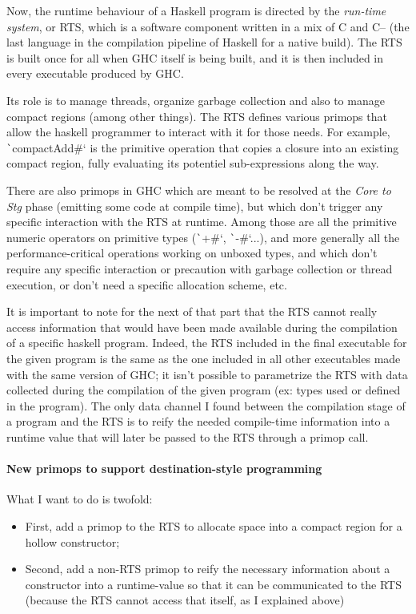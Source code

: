 \documentclass[english]{jflart}
\begin{document}
Now, the runtime behaviour of a Haskell program is directed by the \emph{run-time system}, or RTS, which is a software component written in a mix of C and C-- (the last language in the compilation pipeline of Haskell for a native build). The RTS is built once for all when GHC itself is being built, and it is then included in every executable produced by GHC.

Its role is to manage threads, organize garbage collection and also to manage compact regions (among other things). The RTS defines various primops that allow the haskell programmer to interact with it for those needs. For example, \texttt`compactAdd#` is the primitive operation that copies a closure into an existing compact region, fully evaluating its potentiel sub-expressions along the way.

There are also primops in GHC which are meant to be resolved at the \emph{Core to Stg} phase (emitting some code at compile time), but which don't trigger any specific interaction with the RTS at runtime. Among those are all the primitive numeric operators on primitive types (\texttt`+#`, \texttt`-#`...), and more generally all the performance-critical operations working on unboxed types, and which don't require any specific interaction or precaution with garbage collection or thread execution, or don't need a specific allocation scheme, etc.

It is important to note for the next of that part that the RTS cannot really access information that would have been made available during the compilation of a specific haskell program. Indeed, the RTS included in the final executable for the given program is the same as the one included in all other executables made with the same version of GHC; it isn't possible to parametrize the RTS with data collected during the compilation of the given program (ex: types used or defined in the program). The only data channel I found between the compilation stage of a program and the RTS is to reify the needed compile-time information into a runtime value that will later be passed to the RTS through a primop call.

\paragraph{New primops to support destination-style programming}

What I want to do is twofold:
\begin{itemize}
\item First, add a primop to the RTS to allocate space into a compact region for a hollow constructor;
\item Second, add a non-RTS primop to reify the necessary information about a constructor into a runtime-value so that it can be communicated to the RTS (because the RTS cannot access that itself, as I explained above)
\end{itemize}
\end{document}

